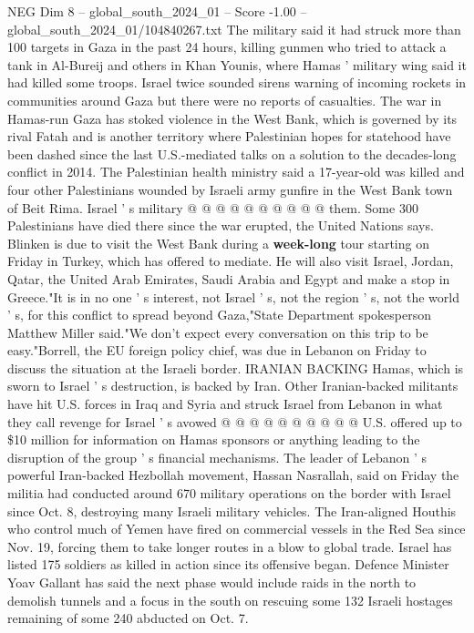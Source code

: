 \begin{textsample}{NEG Dim 8 – global\_south\_2024\_01 – Score -1.00 – global\_south\_2024\_01/104840267.txt}
The military said it had struck more than 100 targets in Gaza in the past 24 hours, killing gunmen who tried to attack a tank in Al-Bureij and others in Khan Younis, where Hamas ' military wing said it had killed some troops.
Israel twice sounded sirens warning of incoming rockets in communities around Gaza but there were no reports of casualties.
The war in Hamas-run Gaza has stoked violence in the West Bank, which is governed by its rival Fatah and is another territory where Palestinian hopes for statehood have been dashed since the last U.S.-mediated talks on a solution to the decades-long conflict in 2014.
The Palestinian health ministry said a 17-year-old was killed and four other Palestinians wounded by Israeli army gunfire in the West Bank town of Beit Rima.
Israel ' s military @ @ @ @ @ @ @ @ @ @ them.
Some 300 Palestinians have died there since the war erupted, the United Nations says.
Blinken is due to visit the West Bank during a \textbf{week-long} tour starting on Friday in Turkey, which has offered to mediate.
He will also visit Israel, Jordan, Qatar, the United Arab Emirates, Saudi Arabia and Egypt and make a stop in Greece."It is in no one ' s interest, not Israel ' s, not the region ' s, not the world ' s, for this conflict to spread beyond Gaza,"State Department spokesperson Matthew Miller said."We don't expect every conversation on this trip to be easy."Borrell, the EU foreign policy chief, was due in Lebanon on Friday to discuss the situation at the Israeli border.
IRANIAN BACKING Hamas, which is sworn to Israel ' s destruction, is backed by Iran.
Other Iranian-backed militants have hit U.S. forces in Iraq and Syria and struck Israel from Lebanon in what they call revenge for Israel ' s avowed @ @ @ @ @ @ @ @ @ @ U.S. offered up to \$10 million for information on Hamas sponsors or anything leading to the disruption of the group ' s financial mechanisms.
The leader of Lebanon ' s powerful Iran-backed Hezbollah movement, Hassan Nasrallah, said on Friday the militia had conducted around 670 military operations on the border with Israel since Oct. 8, destroying many Israeli military vehicles.
The Iran-aligned Houthis who control much of Yemen have fired on commercial vessels in the Red Sea since Nov. 19, forcing them to take longer routes in a blow to global trade.
Israel has listed 175 soldiers as killed in action since its offensive began.
Defence Minister Yoav Gallant has said the next phase would include raids in the north to demolish tunnels and a focus in the south on rescuing some 132 Israeli hostages remaining of some 240 abducted on Oct. 7.

\end{textsample}
